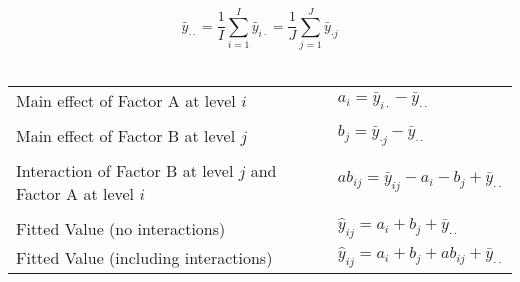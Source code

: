 \documentclass[10pt,landscape]{article}
\begin{document}
\begin{multicols}{2}
   $$\bar{y}_{\cdot \cdot} = \frac{1}{I} \sum_{i = 1}^I \bar{y}_{i \cdot} = \frac{1}{J} \sum_{j = 1}^J \bar{y}_{\cdot j} $$ \\

\begin{center}
\begin{tabular}{@{}ll@{}}
   Main effect of Factor A at level $i$ & $a_i = \bar{y}_{i \cdot} - \bar{y}_{\cdot \cdot}$ \\
        & \\
   Main effect of Factor B at level $j$ & $b_j = \bar{y}_{\cdot j} - \bar{y}_{\cdot \cdot}$ \\
        & \\
   Interaction of Factor B at level $j$  and Factor A at level $i$ & $ab_{ij} = \bar{y}_{ij} - a_i - b_j + \bar{y}_{\cdot \cdot}$ \\
        & \\
   Fitted Value (no interactions) & $\hat{y}_{ij} = a_i + b_j + \bar{y}_{\cdot \cdot}$ 
        & \\
   Fitted Value (including interactions) & $\hat{y}_{ij} = a_i + b_j + ab_{ij} + \bar{y}_{\cdot \cdot}$
        & \\
\end{tabular}
\end{center}


\end{multicols}
\end{document}

